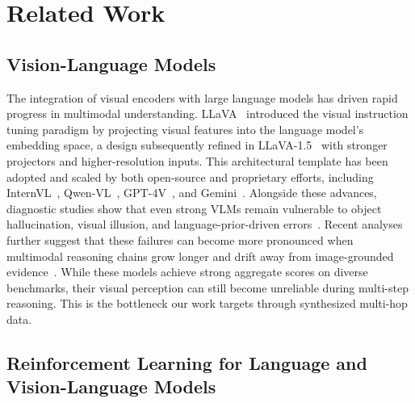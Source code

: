 \section{Related Work}

\subsection{Vision-Language Models}

The integration of visual encoders with large language models has driven rapid progress in multimodal understanding.
LLaVA~ introduced the visual instruction tuning paradigm by projecting visual features into the language model's embedding space, a design subsequently refined in LLaVA-1.5~ with stronger projectors and higher-resolution inputs.
This architectural template has been adopted and scaled by both open-source and proprietary efforts, including InternVL~, Qwen-VL~, GPT-4V~, and Gemini~.
Alongside these advances, diagnostic studies show that even strong VLMs remain vulnerable to object hallucination, visual illusion, and language-prior-driven errors~.
Recent analyses further suggest that these failures can become more pronounced when multimodal reasoning chains grow longer and drift away from image-grounded evidence~.
While these models achieve strong aggregate scores on diverse benchmarks, their visual perception can still become unreliable during multi-step reasoning.
This is the bottleneck our work targets through synthesized multi-hop data.

\subsection{Reinforcement Learning for Language and Vision-Language Models}


